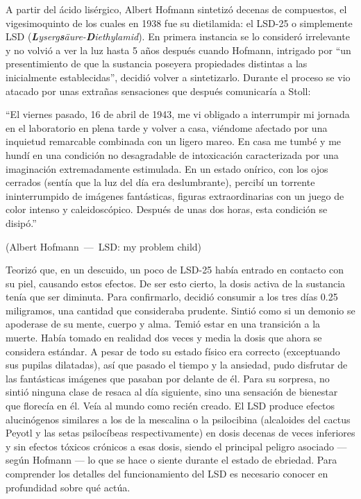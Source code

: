 A partir del ácido lisérgico, Albert Hofmann sintetizó decenas de compuestos, el vigesimoquinto de los cuales en 1938 fue su dietilamida: el LSD-25 o simplemente LSD (\textit{\textbf{L}yserg\textbf{s}äure-\textbf{D}iethylamid}). En primera instancia se lo consideró irrelevante y no volvió a ver la luz hasta 5 años después cuando Hofmann, intrigado por \enquote{un presentimiento de que la sustancia poseyera propiedades distintas a las inicialmente establecidas}, decidió volver a sintetizarlo. Durante el proceso se vio atacado por unas extrañas sensaciones que después comunicaría a Stoll:

\let\oldquote\quote
\let\endoldquote\endquote
\renewenvironment{quote}[2][]
  {\if\relax\detokenize{#1}\relax
     \def\quoteauthor{#2}%
   \else
     \def\quoteauthor{#2~---~#1}%
   \fi
   \oldquote}
  {\par\nobreak\smallskip\hfill(\quoteauthor)%
   \endoldquote\addvspace{\bigskipamount}}

\begin{quote}[LSD: my problem child]{Albert Hofmann}
	\enquote{El viernes pasado, 16 de abril de 1943, me vi obligado a interrumpir mi jornada en el laboratorio en plena tarde y volver a casa, viéndome afectado por una inquietud remarcable combinada con un ligero mareo. En casa me tumbé y me hundí en una condición no desagradable de intoxicación caracterizada por una imaginación extremadamente estimulada. En un estado onírico, con los ojos cerrados (sentía que la luz del día era deslumbrante), percibí un torrente ininterrumpido de imágenes fantásticas, figuras extraordinarias con un juego de color intenso y caleidoscópico. Después de unas dos horas, esta condición se disipó.}
\end{quote}

Teorizó que, en un descuido, un poco de LSD-25 había entrado en contacto con su piel, causando estos efectos. De ser esto cierto, la dosis activa de la sustancia tenía que ser diminuta. Para confirmarlo, decidió consumir a los tres días 0.25 miligramos, una cantidad que consideraba prudente. Sintió como si un demonio se apoderase de su mente, cuerpo y alma. Temió estar en una transición a la muerte. Había tomado en realidad dos veces y media la dosis que ahora se considera estándar. A pesar de todo su estado físico era correcto (exceptuando sus pupilas dilatadas), así que pasado el tiempo y la ansiedad, pudo disfrutar de las fantásticas imágenes que pasaban por delante de él. Para su sorpresa, no sintió ninguna clase de resaca al día siguiente, sino una sensación de bienestar que florecía en él. Veía al mundo como recién creado. El LSD produce efectos alucinógenos similares a los de la mescalina o la psilocibina (alcaloides del cactus Peyotl y las setas psilocíbeas respectivamente) en dosis decenas de veces inferiores y sin efectos tóxicos crónicos a esas dosis, siendo el principal peligro asociado --- según Hofmann --- lo que se hace o siente durante el estado de ebriedad. Para comprender los detalles del funcionamiento del LSD es necesario conocer en profundidad sobre qué actúa.

\newpage
